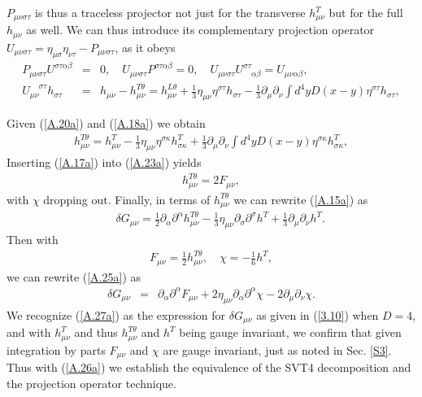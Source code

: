 \documentclass[aps,onecolumn,10pt]{revtex4}
\numberwithin{equation}{section}
\numberwithin{equation}{section}
\begin{document}
%
$P_{\mu\nu\sigma\tau}$ is thus a traceless projector not just for the transverse $h_{\mu\nu}^T$ but for the full $h_{\mu\nu}$ as well. We can thus introduce its complementary projection operator $U_{\mu\nu\sigma\tau}=\eta_{\mu\sigma}\eta_{\nu\tau}-P_{\mu\nu\sigma\tau}$, as it obeys
%
\begin{eqnarray}
P_{\mu\nu\sigma\tau}U^{\sigma\tau\alpha\beta}&=&0,\quad
U_{\mu\nu\sigma\tau}P^{\sigma\tau\alpha\beta}=0,\quad
U_{\mu\nu\sigma\tau}U^{\sigma\tau}_{\phantom{\sigma\tau}\alpha\beta}
=U_{\mu\nu\alpha\beta},
\nonumber\\
U_{\mu\nu}^{\phantom{\mu\nu}\sigma\tau}h_{\sigma\tau}&=&h_{\mu\nu}-h^{T\theta}_{\mu\nu}=
h^{L\theta}_{\mu\nu}+\frac{1}{3}\eta_{\mu\nu}\eta^{\sigma\tau}h_{\sigma\tau}
-\frac{1}{3}\partial_{\mu}\partial_{\nu}\int d^4y D(x-y)\eta^{\sigma\tau}h_{\sigma\tau},
\label{A.22a}
\end{eqnarray}
% 

Given (\ref{A.20a}) and (\ref{A.18a}) we obtain 
%
\begin{eqnarray}
h^{T\theta}_{\mu\nu}= h^{T}_{\mu\nu}-\frac{1}{3}\eta_{\mu\nu}\eta^{\sigma\kappa}h^{T}_{\sigma\kappa}
+\frac{1}{3}\partial_{\mu}\partial_{\nu}\int d^4y D(x-y)\eta^{\sigma\kappa}h^{T}_{\sigma\kappa},
\label{A.23a}
\end{eqnarray}
%
Inserting (\ref{A.17a}) into (\ref{A.23a}) yields
%
\begin{eqnarray}
h^{T\theta}_{\mu\nu}=2F_{\mu\nu},
\label{A.24a}
\end{eqnarray}
%
with $\chi$ dropping out. Finally, in terms of $h^{T\theta}_{\mu\nu}$ we can rewrite (\ref{A.15a}) as 
%
\begin{eqnarray}
&&\delta G_{\mu\nu}=
\tfrac{1}{2}\partial_{\alpha}\partial^{\alpha}h_{\mu\nu}^{T\theta}
-\tfrac{1}{3}\eta_{\mu\nu}\partial_{\sigma}\partial^{\sigma}h^{T}
+\tfrac{1}{3}\partial_{\mu}\partial_{\nu}h^{T}.
\label{A.25a}
\end{eqnarray}
%
Then with 
%
\begin{eqnarray}
F_{\mu\nu}=\tfrac{1}{2}h_{\mu\nu}^{T\theta}, \quad \chi=-\tfrac{1}{6}h^{T},
\label{A.26a}
\end{eqnarray}
%
we can rewrite (\ref{A.25a}) as 
%
\begin{eqnarray}
\delta G_{\mu\nu}&=&\partial_{\alpha}\partial^{\alpha}F_{\mu\nu}+2\eta_{\mu\nu}\partial_{\alpha}\partial^{\alpha}\chi-2\partial_{\mu}\partial_{\nu}\chi.
\label{A.27a}
\end{eqnarray}
%
We recognize (\ref{A.27a}) as the expression for $\delta G_{\mu\nu}$ as given in (\ref{3.10}) when $D=4$, and with $h^T_{\mu\nu}$ and thus $h^{T\theta}_{\mu\nu}$ and $h^T$ being gauge invariant, we confirm that given integration by parts $F_{\mu\nu}$ and $\chi$ are gauge invariant, just as noted in Sec. \ref{S3}. Thus with (\ref{A.26a})
we establish the equivalence of the  SVT4 decomposition and the projection operator technique.
\end{document}
